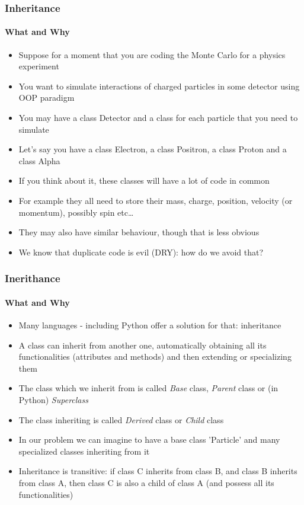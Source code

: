 \documentclass[9pt]{beamer}
\begin{document}
\begin{frame}
  \frametitle{Inheritance}
  \framesubtitle{What and Why}

  \begin{itemize}
    \small
    \item Suppose for a moment that you are coding the Monte Carlo for a physics experiment
    \medskip
    \item You want to simulate interactions of charged particles in some detector using OOP paradigm
    \medskip
    \item You may have a class Detector and a class for each particle that you need to simulate
    \medskip
    \item Let's say you have a class Electron, a class Positron, a class Proton and a class Alpha
    \medskip
    \item If you think about it, these classes will have a lot of code in common
    \medskip
    \item For example they all need to store their mass, charge, position, velocity (or momentum), possibly spin etc\dots
    \medskip
    \item They may also have similar behaviour, though that is less obvious
    \medskip
    \item We know that duplicate code is evil (DRY): how do we avoid that?
  \end{itemize}

\end{frame}


\begin{frame}
  \frametitle{Inerithance}
  \framesubtitle{What and Why}

  \begin{itemize}
    \small
    \item Many languages - including Python offer a solution for that: \alert{inheritance}
    \medskip
    \item A class can inherit from another one, automatically obtaining all its functionalities (attributes and methods) and then extending or specializing them
    \medskip
    \item The class which we inherit from is called \emph{Base} class, \emph{Parent} class or (in Python) \emph{Superclass}
    \medskip
    \item The class inheriting is called \emph{Derived} class or \emph{Child} class
    \medskip
    \item In our problem we can imagine to have a base class 'Particle' and many specialized classes inheriting from it
    \medskip
    \item Inheritance is transitive: if class C inherits from class B, and class B inherits from class A, then class C is also a child of class A (and possess all its functionalities)
  \end{itemize}

\end{frame}
\end{document}
